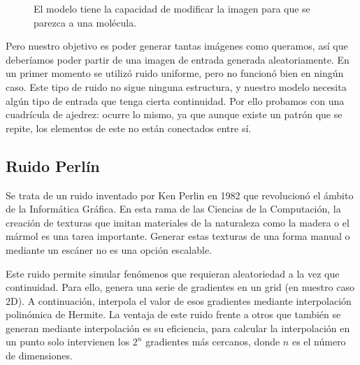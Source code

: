 \begin{figure}[H]
\centering
    \caption{El modelo tiene la capacidad de modificar la imagen para que se parezca a una molécula.}
\end{figure}

Pero nuestro objetivo es poder generar tantas imágenes como queramos, así que deberíamos poder partir de una imagen de entrada generada aleatoriamente. En un primer momento se utilizó ruido uniforme, pero no funcionó bien en ningún caso. Este tipo de ruido no sigue ninguna estructura, y nuestro modelo necesita algún tipo de entrada que tenga cierta continuidad. Por ello probamos con una cuadrícula de ajedrez: ocurre lo mismo, ya que aunque existe un patrón que se repite, los elementos de este no están conectados entre sí.

\subsection{Ruido Perlín}
Se trata de un ruido inventado por Ken Perlin en 1982 que revolucionó el ámbito de la Informática Gráfica. En esta rama de las Ciencias de la Computación, la creación de texturas que imitan materiales de la naturaleza como la madera o el mármol es una tarea importante. Generar estas texturas de una forma manual o mediante un escáner no es una opción escalable.

Este ruido permite simular fenómenos que requieran aleatoriedad a la vez que continuidad. Para ello, genera una serie de gradientes en un grid (en nuestro caso 2D). A continuación, interpola el valor de esos gradientes mediante interpolación polinómica de Hermite. La ventaja de este ruido frente a otros que también se generan mediante interpolación es su eficiencia, para calcular la interpolación en un punto solo intervienen los $2^n$ gradientes más cercanos, donde $n$ es el número de dimensiones.

